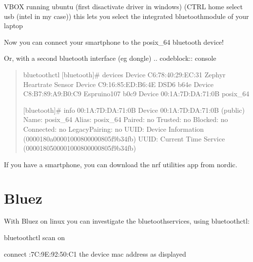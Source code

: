 \documentclass[letterpaper,10pt,english]{sphinxmanual}
\begin{document}
VBOX running ubuntu (first disactivate driver in windows)
(CTRL home \textendash{} select usb \textendash{} (intel in my case)) \textendash{} this lets you select the integrated bluetoothmodule of your laptop

\begin{sphinxVerbatim}[commandchars=\\\{\}]
  

     
 
\end{sphinxVerbatim}

Now you can connect your smartphone to the posix\_64 bluetooth device!

Or, with a second bluetooth interface (eg dongle)
.. code\sphinxhyphen{}block:: console
\begin{quote}

bluetoothctl
{[}bluetooth{]}\# devices
Device C6:78:40:29:EC:31 Zephyr Heartrate Sensor
Device C9:16:85:ED:B6:4E DS\sphinxhyphen{}D6 b64e
Device C8:B7:89:A9:B0:C9 Espruino\sphinxhyphen{}107 b0c9
Device 00:1A:7D:DA:71:0B posix\_64

{[}bluetooth{]}\# info 00:1A:7D:DA:71:0B
Device 00:1A:7D:DA:71:0B (public)
Name: posix\_64
Alias: posix\_64
Paired: no
Trusted: no
Blocked: no
Connected: no
LegacyPairing: no
UUID: Device Information        (0000180a\sphinxhyphen{}0000\sphinxhyphen{}1000\sphinxhyphen{}8000\sphinxhyphen{}00805f9b34fb)
UUID: Current Time Service      (00001805\sphinxhyphen{}0000\sphinxhyphen{}1000\sphinxhyphen{}8000\sphinxhyphen{}00805f9b34fb)
\end{quote}

If you have a smartphone, you can download the nrf utilities app from nordic.


\section{Bluez}
\label{\detokenize{bluetooth:bluez}}
With Bluez on linux you can investigate the bluetoothservices,  using bluetoothctl:

\begin{sphinxVerbatim}[commandchars=\\\{\}]
bluetoothctl
scan on


connect :7C:9E:92:50:C1 the device mac address as displayed

\end{sphinxVerbatim}
\end{document}
